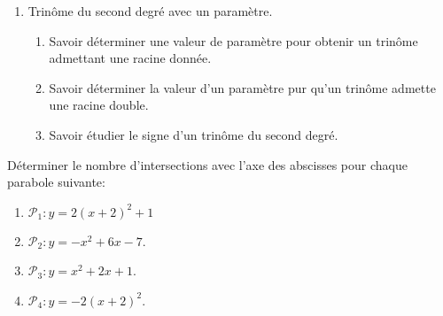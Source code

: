 \documentclass[a4paper,11pt]{article}
\theoremstyle{break}
\begin{document}
  
  \begin{Dev}
    
    \begin{enumerate}
      \item Trinôme du second degré avec un paramètre. 
      \begin{enumerate}
	\item Savoir déterminer une valeur de paramètre pour obtenir un trinôme admettant
	une racine donnée.
	\item Savoir déterminer la valeur d'un paramètre pur qu'un trinôme admette
	une racine double.
	\item Savoir étudier le signe d'un trinôme du second degré.
      \end{enumerate}
    \end{enumerate}
    
    
    
    \vspace{0.5cm}
    
    \begin{dm}
      
      Déterminer le nombre d'intersections avec l'axe des abscisses pour chaque parabole
      suivante:
      \begin{enumerate}
	\item $\mathcal{P}_1:y=2(x+2)^2+1$
	\item $\mathcal{P}_2:y=-x^2+6x-7$.%
	\item $\mathcal{P}_3:y=x^2+2x+1$.
	\item $\mathcal{P}_4:y=-2(x+2)^2$.
      \end{enumerate} 
    \end{dm}
    
  \end{Dev}
  
\end{document}
